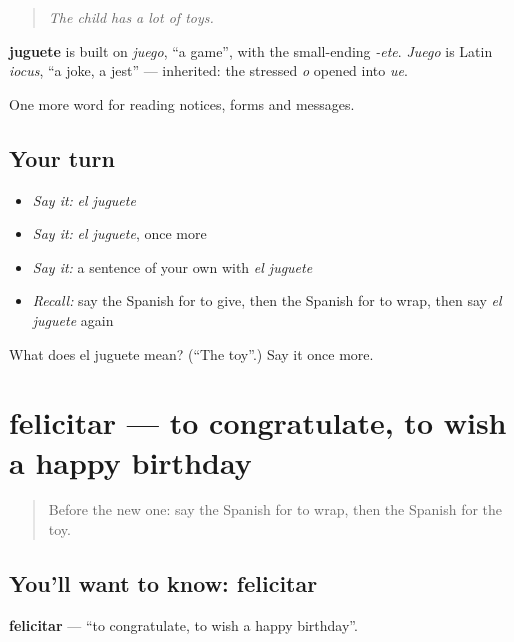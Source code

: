 \begin{quote}
\emph{The child has a lot of toys.}
\end{quote}

\begin{cousinweb}
\textbf{juguete} is built on \emph{juego}, \textquotedblleft{}a game\textquotedblright{}, with the small-ending \emph{-ete}. \emph{Juego} is Latin \emph{iocus}, \textquotedblleft{}a joke, a jest\textquotedblright{} — inherited: the stressed \emph{o} opened into \emph{ue}.
\end{cousinweb}

\begin{grammarlens}[title={What you've built}]
One more word for reading notices, forms and messages.
\end{grammarlens}

\subsection*{Your turn}
\begin{itemize}
\raggedright
  \item \emph{Say it:} \emph{el juguete}
  \item \emph{Say it:} \emph{el juguete}, once more
  \item \emph{Say it:} a sentence of your own with \emph{el juguete}
  \item \emph{Recall:} say the Spanish for to give, then the Spanish for to wrap, then say \emph{el juguete} again
\end{itemize}

\begin{tcolorbox}[breakable,colback=teal!4,colframe=teal!35!black,title={Before you move on}]
What does el juguete mean? (\textquotedblleft{}The toy\textquotedblright{}.) Say it once more.
\end{tcolorbox}
\section[felicitar]{felicitar — to congratulate, to wish a happy birthday}

\label{lesson:ES-C506-felicitar}



\begin{quote}
Before the new one: say the Spanish for to wrap, then the Spanish for the toy.
\end{quote}

\subsection*{You'll want to know: felicitar}
\textbf{felicitar} — \textquotedblleft{}to congratulate, to wish a happy birthday\textquotedblright{}.

